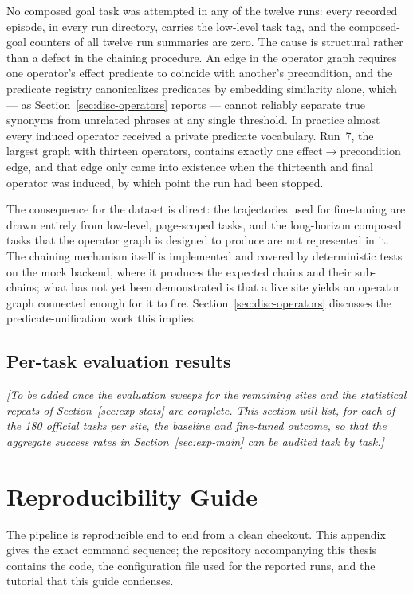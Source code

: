 No composed goal task was attempted in any of the twelve runs: every recorded
episode, in every run directory, carries the low-level task tag, and the
composed-goal counters of all twelve run summaries are zero. The cause is
structural rather
than a defect in the chaining procedure. An edge in the operator graph requires
one operator's effect predicate to coincide with another's precondition, and
the predicate registry canonicalizes predicates by embedding similarity alone,
which --- as Section~\ref{sec:disc-operators} reports --- cannot reliably
separate true synonyms from unrelated phrases at any single threshold. In
practice almost every induced operator received a private predicate
vocabulary. Run~7, the largest graph with thirteen operators, contains exactly
one effect$\rightarrow$precondition edge, and that edge only came into
existence when the thirteenth and final operator was induced, by which point
the run had been stopped.

The consequence for the dataset is direct: the trajectories used for
fine-tuning are drawn entirely from low-level, page-scoped tasks, and the
long-horizon composed tasks that the operator graph is designed to produce are
not represented in it. The chaining mechanism itself is implemented and
covered by deterministic tests on the mock backend, where it produces the
expected chains and their sub-chains; what has not yet been demonstrated is
that a live site yields an operator graph connected enough for it to fire.
Section~\ref{sec:disc-operators} discusses the predicate-unification work this
implies.

\section{Per-task evaluation results}
\label{app:runs-eval}

\textit{[To be added once the evaluation sweeps for the remaining sites and the
statistical repeats of Section~\ref{sec:exp-stats} are complete. This section
will list, for each of the 180 official tasks per site, the baseline and
fine-tuned outcome, so that the aggregate success rates in
Section~\ref{sec:exp-main} can be audited task by task.]}

\chapter{Reproducibility Guide}
\label{app:repro}

The pipeline is reproducible end to end from a clean checkout. This appendix
gives the exact command sequence; the repository accompanying this thesis
contains the code, the configuration file used for the reported runs, and the
tutorial that this guide condenses.

